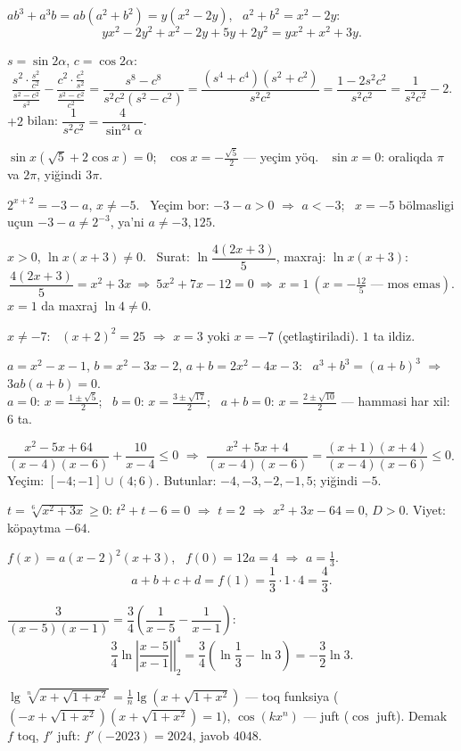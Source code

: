 $ab^3+a^3b=ab(a^2+b^2)=y(x^2-2y)$, \ $a^2+b^2=x^2-2y$:
\[yx^2-2y^2+x^2-2y+5y+2y^2=yx^2+x^2+3y.\]

$s=\sin2\alpha$, $c=\cos2\alpha$:
\[\frac{s^2\cdot\frac{s^2}{c^2}}{\frac{s^2-c^2}{s^2}}-\frac{c^2\cdot\frac{c^2}{s^2}}{\frac{s^2-c^2}{c^2}}=\frac{s^8-c^8}{s^2c^2(s^2-c^2)}=\frac{(s^4+c^4)(s^2+c^2)}{s^2c^2}=\frac{1-2s^2c^2}{s^2c^2}=\frac1{s^2c^2}-2.\]
$+2$ bilan: $\dfrac1{s^2c^2}=\dfrac4{\sin^24\alpha}$.

$\sin x\left(\sqrt5+2\cos x\right)=0$; \ $\cos x=-\frac{\sqrt5}2$ — yeçim yöq. \ $\sin x=0$: oraliqda $\pi$ va $2\pi$, yiğindi $3\pi$.

$2^{x+2}=-3-a$, $x\ne-5$. \ Yeçim bor: $-3-a>0$ $\Rightarrow$ $a<-3$; \ $x=-5$ bölmasligi uçun $-3-a\ne2^{-3}$, ya'ni $a\ne-3{,}125$.

$x>0$, $\ln x(x+3)\ne0$. \ Surat: $\ln\dfrac{4(2x+3)}5$, maxraj: $\ln x(x+3)$:
\[\frac{4(2x+3)}5=x^2+3x\ \Rightarrow\ 5x^2+7x-12=0\ \Rightarrow\ x=1\ \left(x=-\tfrac{12}5\text{ — mos emas}\right).\]
$x=1$ da maxraj $\ln4\ne0$.

$x\ne-7$: \ $(x+2)^2=25$ $\Rightarrow$ $x=3$ yoki $x=-7$ (çetlaştiriladi). $1$ ta ildiz.

$a=x^2-x-1$, $b=x^2-3x-2$, $a+b=2x^2-4x-3$: \ $a^3+b^3=(a+b)^3$ $\Rightarrow$ $3ab(a+b)=0$.\\
$a=0$: $x=\frac{1\pm\sqrt5}2$; \ $b=0$: $x=\frac{3\pm\sqrt{17}}2$; \ $a+b=0$: $x=\frac{2\pm\sqrt{10}}2$ — hammasi har xil: $6$ ta.

$\dfrac{x^2-5x+64}{(x-4)(x-6)}+\dfrac{10}{x-4}\le0$ $\Rightarrow$ $\dfrac{x^2+5x+4}{(x-4)(x-6)}=\dfrac{(x+1)(x+4)}{(x-4)(x-6)}\le0$.\\
Yeçim: $[-4;-1]\cup(4;6)$. Butunlar: $-4,-3,-2,-1,5$; yiğindi $-5$.

$t=\sqrt[6]{x^2+3x}\ge0$: $t^2+t-6=0$ $\Rightarrow$ $t=2$ $\Rightarrow$ $x^2+3x-64=0$, $D>0$. Viyet: köpaytma $-64$.

$f(x)=a(x-2)^2(x+3)$, \ $f(0)=12a=4$ $\Rightarrow$ $a=\frac13$.
\[a+b+c+d=f(1)=\frac13\cdot1\cdot4=\frac43.\]

$\dfrac3{(x-5)(x-1)}=\dfrac34\left(\dfrac1{x-5}-\dfrac1{x-1}\right)$:
\[\frac34\left.\ln\left|\frac{x-5}{x-1}\right|\right|_2^4=\frac34\left(\ln\frac13-\ln3\right)=-\frac32\ln3.\]

$\lg\sqrt[n]{x+\sqrt{1+x^2}}=\frac1n\lg\left(x+\sqrt{1+x^2}\right)$ — toq funksiya ($(-x+\sqrt{1+x^2})(x+\sqrt{1+x^2})=1$), $\cos(kx^n)$ — juft ($\cos$ juft). Demak $f$ toq, $f'$ juft: $f'(-2023)=2024$, javob $4048$.

